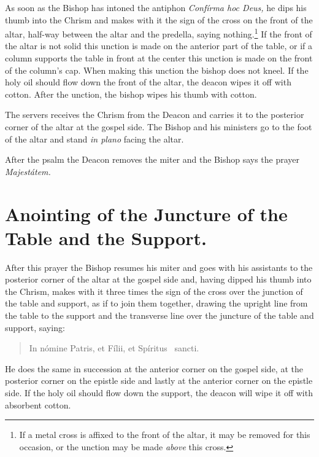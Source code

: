 \documentclass[letterpaper]{report}
\begin{document}
{    \rubric As soon as the Bishop has intoned the antiphon \textit{Confírma hoc
    Deus,} he dips his thumb into the Chrism and makes with it the sign of the
    cross on the front of the altar, half-way between the altar and the
    predella, saying nothing.\footnote{If a metal cross is affixed to the front
    of the altar, it may be removed for this occasion, or the unction may be
    made \textit{above} this cross.} If the front of the altar is not solid
    this unction is made on the anterior part of the table, or if a column
    supports the table in front at the center this unction is made on the front
    of the column's cap. When making this unction the bishop does not kneel. If
    the holy oil should flow down the front of the altar, the deacon wipes it
    off with cotton. After the unction, the bishop wipes his thumb with cotton.

    \rubric The servers receives the Chrism from the Deacon and carries it to
    the posterior corner of the altar at the gospel side. The Bishop and his
    ministers go to the foot of the altar and stand \textit{in plano} facing
    the altar.

    After the psalm the Deacon removes the miter and the Bishop says the prayer
    \textit{Majestátem.}

    \section{Anointing of the Juncture of the Table and the Support.}

    \rubric After this prayer the Bishop resumes his miter and goes with his
    assistants to the posterior corner of the altar at the gospel side and,
    having dipped his thumb into the Chrism, makes with it three times the sign
    of the cross over the junction of the table and support, as if to join them
    together, drawing the upright line from the table to the support and the
    transverse line over the juncture of the table and support, saying:

    \begin{quote}
        In nómine Pa\cross tris, et Fí\cross lii, et Spíritus \cross\ sancti.
    \end{quote}

    He does the same in succession at the anterior corner on the gospel side, at
    the posterior corner on the epistle side and lastly at the anterior corner on
    the epistle side. If the holy oil should flow down the support, the deacon will
    wipe it off with absorbent cotton.

}
\end{document}
